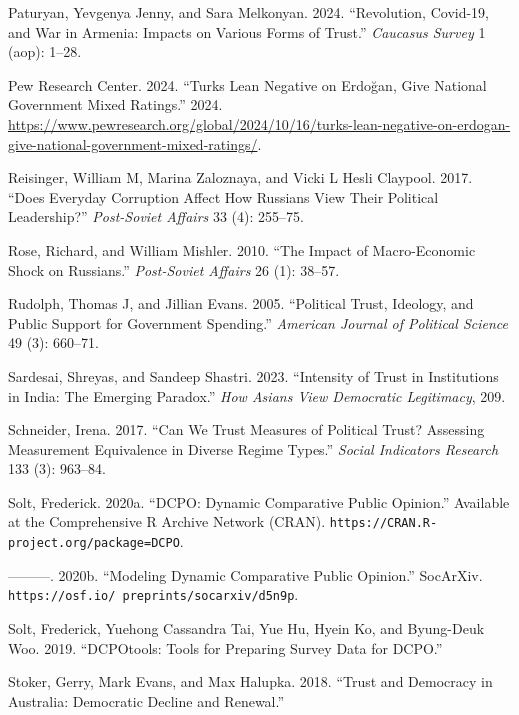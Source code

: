 \documentclass[
  12pt,
]{article}
\newlength{\cslhangindent}
\newenvironment{CSLReferences}[2] %
 {\begin{list}{}{%
  \setlength{\itemindent}{0pt}
  \setlength{\leftmargin}{0pt}
  \setlength{\parsep}{0pt}
  \ifodd #1
   \setlength{\leftmargin}{\cslhangindent}
   \setlength{\itemindent}{-1\cslhangindent}
  \fi
  \setlength{\itemsep}{#2\baselineskip}}}
 {\end{list}}
\begin{document}
\begin{CSLReferences}{1}{0}
Paturyan, Yevgenya Jenny, and Sara Melkonyan. 2024. {``Revolution, Covid-19, and War in Armenia: Impacts on Various Forms of Trust.''} \emph{Caucasus Survey} 1 (aop): 1--28.

Pew Research Center. 2024. {``Turks Lean Negative on Erdoğan, Give National Government Mixed Ratings.''} 2024. \url{https://www.pewresearch.org/global/2024/10/16/turks-lean-negative-on-erdogan-give-national-government-mixed-ratings/}.

Reisinger, William M, Marina Zaloznaya, and Vicki L Hesli Claypool. 2017. {``Does Everyday Corruption Affect How Russians View Their Political Leadership?''} \emph{Post-Soviet Affairs} 33 (4): 255--75.

Rose, Richard, and William Mishler. 2010. {``The Impact of Macro-Economic Shock on Russians.''} \emph{Post-Soviet Affairs} 26 (1): 38--57.

Rudolph, Thomas J, and Jillian Evans. 2005. {``Political Trust, Ideology, and Public Support for Government Spending.''} \emph{American Journal of Political Science} 49 (3): 660--71.

Sardesai, Shreyas, and Sandeep Shastri. 2023. {``Intensity of Trust in Institutions in India: The Emerging Paradox.''} \emph{How Asians View Democratic Legitimacy}, 209.

Schneider, Irena. 2017. {``Can We Trust Measures of Political Trust? Assessing Measurement Equivalence in Diverse Regime Types.''} \emph{Social Indicators Research} 133 (3): 963--84.

Solt, Frederick. 2020a. {``{DCPO}: Dynamic Comparative Public Opinion.''} Available at the Comprehensive R Archive Network (CRAN). \texttt{https://CRAN.R-project.org/package=DCPO}.

---------. 2020b. {``Modeling Dynamic Comparative Public Opinion.''} SocArXiv. \texttt{https://osf.io/\ preprints/socarxiv/d5n9p}.

Solt, Frederick, Yuehong Cassandra Tai, Yue Hu, Hyein Ko, and Byung-Deuk Woo. 2019. {``DCPOtools: Tools for Preparing Survey Data for DCPO.''}

Stoker, Gerry, Mark Evans, and Max Halupka. 2018. {``Trust and Democracy in Australia: Democratic Decline and Renewal.''}


\end{CSLReferences}
\end{document}
